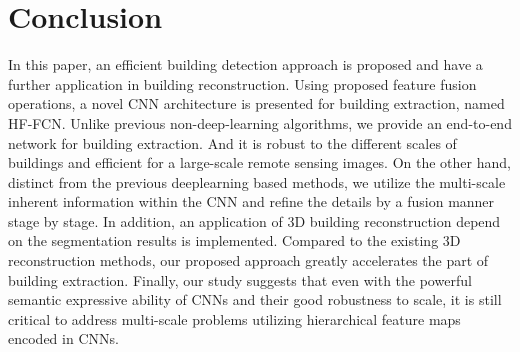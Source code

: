 \section{Conclusion}
\label{Sec:Con}
 In this paper, an efficient building detection approach is proposed and have a further application in building reconstruction.
 Using proposed feature fusion operations, a novel CNN architecture is presented for building extraction, named HF-FCN.
 Unlike previous non-deep-learning algorithms, we provide an end-to-end network for building extraction.
 And it is robust to the different scales of buildings and efficient for a large-scale remote sensing images.
 On the other hand, distinct from the previous deeplearning based methods, we utilize the multi-scale inherent information within the CNN and refine the details by a fusion manner stage by stage.
 In addition, an application of 3D building reconstruction depend on the segmentation results is implemented.
 Compared to the existing 3D reconstruction methods, our proposed approach greatly accelerates the part of building extraction.
 Finally, our study suggests that even with the powerful semantic expressive ability of CNNs and their good robustness to scale, it is still critical to address multi-scale problems utilizing hierarchical feature maps encoded in CNNs.


